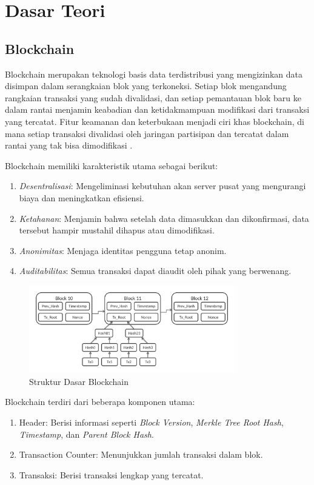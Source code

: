 \section{Dasar Teori}
\subsection{Blockchain}
Blockchain merupakan teknologi basis data terdistribusi yang mengizinkan data disimpan dalam serangkaian blok yang terkoneksi. Setiap blok mengandung rangkaian transaksi yang sudah divalidasi, dan setiap pemantauan blok baru ke dalam rantai menjamin keabadian dan ketidakmampuan modifikasi dari transaksi yang tercatat. Fitur keamanan dan keterbukaan menjadi ciri khas blockchain, di mana setiap transaksi divalidasi oleh jaringan partisipan dan tercatat dalam rantai yang tak bisa dimodifikasi \parencite{ref1}.

Blockchain memiliki karakteristik utama sebagai berikut:
\begin{enumerate}
    \item \textit{Desentralisasi}: Mengeliminasi kebutuhan akan server pusat yang mengurangi biaya dan meningkatkan efisiensi.
    \item \textit{Ketahanan}: Menjamin bahwa setelah data dimasukkan dan dikonfirmasi, data tersebut hampir mustahil dihapus atau dimodifikasi.
    \item \textit{Anonimitas}: Menjaga identitas pengguna tetap anonim.
    \item \textit{Auditabilitas}: Semua transaksi dapat diaudit oleh pihak yang berwenang.
\end{enumerate}

\begin{figure}[H]
    \centering
    \includegraphics[width=0.8\textwidth]{gambar/2.2.1.png}
    \caption{Struktur Dasar Blockchain \parencite{ref1}}
    \label{fig:blockchain-structure}
\end{figure}

Blockchain terdiri dari beberapa komponen utama:
\begin{enumerate}
    \item Header: Berisi informasi seperti \textit{Block Version}, \textit{Merkle Tree Root Hash}, \textit{Timestamp}, dan \textit{Parent Block Hash}.
    \item Transaction Counter: Menunjukkan jumlah transaksi dalam blok.
    \item Transaksi: Berisi transaksi lengkap yang tercatat.
\end{enumerate}

